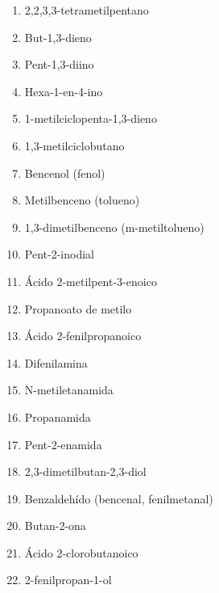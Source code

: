 \documentclass[
]{article}
\providecommand{\tightlist}{%
  \setlength{\itemsep}{0pt}\setlength{\parskip}{0pt}}
\begin{document}
\begin{solution}

\begin{enumerate}
\def\labelenumi{\alph{enumi})}
\tightlist
\item
  2,2,3,3-tetrametilpentano
\item
  But-1,3-dieno
\item
  Pent-1,3-diino
\item
  Hexa-1-en-4-ino
\item
  1-metilciclopenta-1,3-dieno
\item
  1,3-metilciclobutano
\item
  Bencenol (fenol)
\item
  Metilbenceno (tolueno)
\item
  1,3-dimetilbenceno (m-metiltolueno)
\item
  Pent-2-inodial
\item
  Ácido 2-metilpent-3-enoico
\item
  Propanoato de metilo
\item
  Ácido 2-fenilpropanoico
\item
  Difenilamina
\item
  N-metiletanamida
\item
  Propanamida
\item
  Pent-2-enamida
\item
  2,3-dimetilbutan-2,3-diol
\item
  Benzaldehído (bencenal, fenilmetanal)
\item
  Butan-2-ona
\item
  Ácido 2-clorobutanoico
\item
  2-fenilpropan-1-ol
\end{enumerate}

\end{solution}
\end{document}
